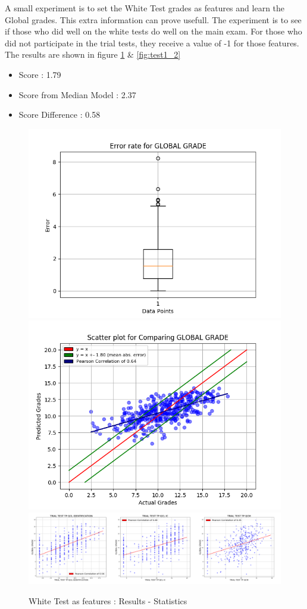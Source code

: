 \documentclass[a4paper,11pt]{report}
\numberwithin{figure}{chapter} %
\begin{document}
    A small experiment is to set the White Test grades as features and learn the Global grades.
    This extra information can prove usefull.
    The experiment is to see if those who did well on the white tests do well on the main exam.
    For those who did not participate in the trial tests, they receive a value of -1 for those features.
    The results are shown in figure \ref{fig:test1_1} \& \ref{fig:test1_2}
    \begin{itemize}
        \item[\textbullet] Score : 1.79
        \item[\textbullet] Score from Median Model : 2.37
        \item[\textbullet] Score Difference : 0.58
    \end{itemize}
      \begin{figure}[H]
      \centering
      \includegraphics[width=.40\linewidth]{plots/test1_cv_boxplot_GLOBAL_GRADE_2018-05-17_20_39_42.png}
      \includegraphics[width=.40\linewidth]{plots/test1_cv_comp_GLOBAL_GRADE_2018-05-17_20_39_42.png}\\
      \includegraphics[width=.99\linewidth]{plots/test1_var_correlation_GLOBAL_GRADE_2018-05-17_10_12_19.png}
      \caption{White Test as features : Results - Statistics}
      \label{fig:test1_1}
      \end{figure}
\end{document}
